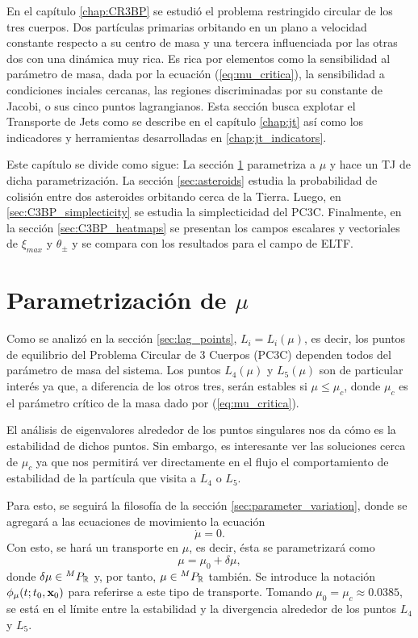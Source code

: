 En el capítulo \ref{chap:CR3BP} se estudió el problema restringido circular de los tres cuerpos. Dos partículas primarias orbitando en un plano a velocidad constante respecto a su centro de masa y una tercera influenciada por las otras dos con una dinámica muy rica. Es rica por elementos como la sensibilidad al parámetro de masa, dada por la ecuación (\ref{eq:mu_critica}), la sensibilidad a condiciones inciales cercanas, las regiones discriminadas por su constante de Jacobi, o sus cinco puntos lagrangianos. Esta sección busca explotar el Transporte de Jets como se describe en el capítulo \ref{chap:jt} así como los indicadores y herramientas desarrolladas en \ref{chap:jt_indicators}.


Este capítulo se divide como sigue: La sección \ref{sec:parametrization} parametriza a $\mu$ y hace un TJ de dicha parametrización. La sección \ref{sec:asteroids} estudia la probabilidad de colisión entre dos asteroides orbitando cerca de la Tierra. Luego, en \ref{sec:C3BP_simplecticity} se estudia la simplecticidad del PC3C. Finalmente, en la sección \ref{sec:C3BP_heatmaps} se presentan los campos escalares y vectoriales de $\xi_{max}$ y $\theta_{\pm}$ y se compara con los resultados para el campo de ELTF.

\section{Parametrización de $\mu$}
\label{sec:parametrization}

Como se analizó en la sección \ref{sec:lag_points}, $L_i = L_i(\mu)$, es decir, los puntos de equilibrio del Problema Circular de 3 Cuerpos (PC3C) dependen todos del parámetro de masa del sistema. Los puntos $L_4(\mu)$ y $L_5(\mu)$ son de particular interés ya que, a diferencia de los otros tres, serán estables si $\mu \leq \mu_c$, donde $\mu_c$ es el parámetro crítico de la masa dado por (\ref{eq:mu_critica}). 

El análisis de eigenvalores alrededor de los puntos singulares nos da cómo es la estabilidad de dichos puntos. Sin embargo, es interesante ver las soluciones cerca de $\mu_c$ ya que nos permitirá ver directamente en el flujo el comportamiento de estabilidad de la partícula que visita a $L_4$ o $L_5$.

Para esto, se seguirá la filosofía de la sección \ref{sec:parameter_variation}, donde se agregará a las ecuaciones de movimiento la ecuación 
\begin{equation*}
 \dot{\mu} = 0.
\end{equation*}
Con esto, se hará un transporte en $\mu$, es decir, ésta se parametrizará como 
\begin{equation*}
 \mu = \mu_0 + \delta\mu,
\end{equation*}   
donde $\delta\mu \in {^{M}P_{\mathbb{R}}}$ y, por tanto, $\mu \in {^{M}P_{\mathbb{R}}}$ también. Se introduce la notación $\phi_\mu(t;t_0,\mathbf{x}_0)$ para referirse a este tipo de transporte. Tomando $\mu_0 = \mu_c \approx 0.0385$, se está en el límite entre la estabilidad y la divergencia alrededor de los puntos $L_4$ y $L_5$.

